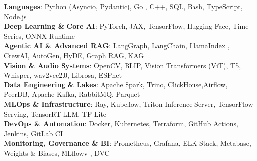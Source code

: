 \begin{itemize}[leftmargin=0.15in, label={}]
	\small{\item{
			\textbf{Languages}{: Python (Asyncio, Pydantic), Go , C++, SQL, Bash, TypeScript, Node.js} \\
			\textbf{Deep Learning \& Core AI}{: PyTorch, JAX, TensorFlow, Hugging Face, Time-Series, ONNX Runtime} \\
			\textbf{Agentic AI \& Advanced RAG}{: LangGraph, LangChain, LlamaIndex , CrewAI, AutoGen, HyDE, Graph RAG, KAG} \\
			\textbf{Vision \& Audio Systems}{: OpenCV, BLIP, Vision Transformers (ViT), T5, Whisper, wav2vec2.0, Librosa, ESPnet} \\
			\textbf{Data Engineering \& Lakes}{: Apache Spark, Trino, ClickHouse,Airflow, PeerDB, Apache Kafka, RabbitMQ, Parquet} \\
			\textbf{MLOps \& Infrastructure}{: Ray, Kubeflow, Triton Inference Server, TensorFlow Serving, TensorRT-LLM, TF Lite} \\
			\textbf{DevOps \& Automation}{: Docker, Kubernetes, Terraform, GitHub Actions, Jenkins, GitLab CI} \\
			\textbf{Monitoring, Governance \& BI}{: Prometheus, Grafana, ELK Stack, Metabase, Weights \& Biases, MLflowv , DVC}
	}}
\end{itemize}
